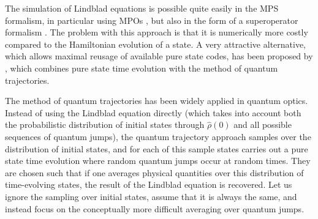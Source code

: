 The simulation of Lindblad equations is possible quite easily in the MPS formalism, in particular using MPOs \cite{VerstraeteRipoll04}, but also in the form of a superoperator formalism \cite{VidalZwolak04}. The problem with this approach is that it is numerically more costly compared to the Hamiltonian evolution of a state. A very attractive alternative, which allows maximal reusage of available pure state codes, has been proposed by \cite{Daley09}, which combines pure state time evolution with the method of quantum trajectories. 

The method of quantum trajectories has been widely applied in quantum optics\cite{Plenio98}. Instead of using the Lindblad equation directly (which takes into account both the probabilistic distribution of initial states through $\hat{\rho}(0)$ and all possible sequences of quantum jumps), the quantum trajectory approach samples over the distribution of initial states, and for each of this sample states carries out a pure state time evolution where random quantum jumps occur at random times. They are chosen such that if one averages physical quantities over this distribution of time-evolving states, the result of the Lindblad equation is recovered. Let us ignore the sampling over initial states, assume that it is always the same, and instead focus on the conceptually more difficult averaging over quantum jumps.

